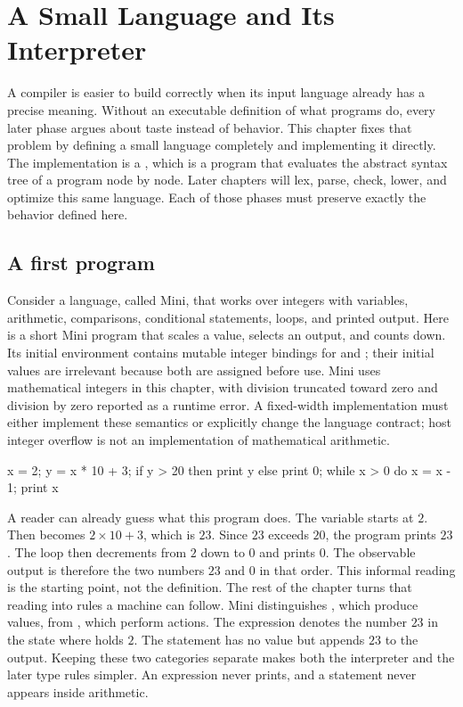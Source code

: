 \chapter{A Small Language and Its Interpreter}
\label{ch:small-language-interpreter}

A compiler is easier to build correctly when its input language already has a precise meaning.
Without an executable definition of what programs do, every later phase argues about taste instead of behavior.
This chapter fixes that problem by defining a small language completely and implementing it directly.
The implementation is a , which is a program that evaluates the abstract syntax tree of a program node by node.
Later chapters will lex, parse, check, lower, and optimize this same language.
Each of those phases must preserve exactly the behavior defined here.

\section{A first program}
\label{sec:ch02-first-program}

Consider a language, called Mini, that works over integers with variables, arithmetic, comparisons, conditional statements, loops, and printed output.
Here is a short Mini program that scales a value, selects an output, and counts down.
Its initial environment contains mutable integer bindings for  and ; their initial values are irrelevant because both are assigned before use.
Mini uses mathematical integers in this chapter, with division truncated toward zero and division by zero reported as a runtime error.
A fixed-width implementation must either implement these semantics or explicitly change the language contract; host integer overflow is not an implementation of mathematical arithmetic.
\begin{irlisting}
x = 2;
y = x * 10 + 3;
if y > 20 then print y else print 0;
while x > 0 do x = x - 1;
print x
\end{irlisting}
A reader can already guess what this program does.
The variable  starts at $2$.
Then  becomes $2 \times 10 + 3$, which is $23$.
Since $23$ exceeds $20$, the program prints $23$.
The loop then decrements  from $2$ down to $0$ and prints $0$.
The observable output is therefore the two numbers $23$ and $0$ in that order.
This informal reading is the starting point, not the definition.
The rest of the chapter turns that reading into rules a machine can follow.
Mini distinguishes , which produce values, from , which perform actions.
The expression  denotes the number $23$ in the state where  holds $2$.
The statement  has no value but appends $23$ to the output.
Keeping these two categories separate makes both the interpreter and the later type rules simpler.
An expression never prints, and a statement never appears inside arithmetic.

